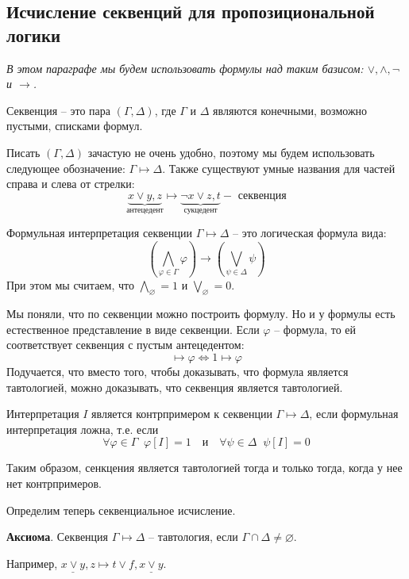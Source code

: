 \subsection{Исчисление секвенций для пропозициональной логики}
\textit{В этом параграфе мы будем использовать формулы над таким базисом: $\lor, \land, \neg$ и $\to$.}

\begin{conj}
    Секвенция -- это пара $(\Gamma, \Delta )$, где $\Gamma$ и $\Delta$ являются конечными, возможно пустыми, списками формул. 
\end{conj}
Писать $(\Gamma, \Delta)$ зачастую не очень удобно, поэтому мы будем использовать следующее обозначение: $\Gamma \mapsto \Delta$.
Также существуют умные названия для частей справа и слева от стрелки: \[ \underbrace{x \lor y, z}_{\text{антецедент}} \mapsto \underbrace{\neg x \lor z, t}_{\text{сукцедент}} - \text{ секвенция} \]

\begin{conj}
    Формульная интерпретация секвенции $\Gamma \mapsto \Delta$ -- это логическая формула вида: \[ \left(\bigwedge_{\varphi \in \Gamma} \varphi \right) \to \left(\bigvee_{\psi \in \Delta} \psi \right)  \]    
    При этом мы считаем, что $\bigwedge\limits_{\varnothing} = 1$ и $\bigvee\limits_{\varnothing} = 0$.
\end{conj}
Мы поняли, что по секвенции можно построить формулу. Но и у формулы есть естественное представление в виде секвенции. Если $\varphi$ -- формула, то ей соответствует секвенция с пустым антецедентом: \[ \mapsto \varphi \Leftrightarrow 1 \mapsto \varphi \]
Подучается, что вместо того, чтобы доказывать, что формула является тавтологией, можно доказывать, что секвенция является тавтологией.

\begin{conj}
    Интерпретация $I$ является контрпримером к секвенции $\Gamma \mapsto \Delta$, если формульная интерпретация ложна, т.е. если \[ \forall \varphi \in \Gamma \;\; \varphi[I] = 1 \quad \text{и} \quad \forall \psi \in \Delta \;\; \psi[I] = 0  \]
\end{conj}
Таким образом, сенкцения является тавтологией тогда и только тогда, когда у нее нет контрпримеров.

Определим теперь секвенциальное исчисление.

\textbf{Аксиома}. Секвенция $\Gamma \mapsto \Delta$ -- тавтология, если $\Gamma \cap \Delta \neq \varnothing$. 

Например, $\underline{x \lor y}, z \mapsto t \lor f, \underline{x \lor y}$.

